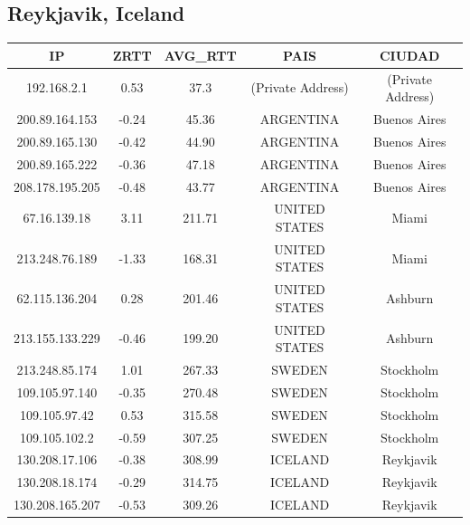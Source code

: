 \FloatBarrier
\subsection{Reykjavik, Iceland}

\begin{tabular}{|c@{\hspace{5ex}}c@{\hspace{5ex}}c@{\hspace{5ex}}c@{\hspace{5ex}}c|}
\hline
\rule{0pt}{1.2em}IP & ZRTT & AVG\_RTT & PAIS & CIUDAD\\[0.2em]
\hline

\rule{0pt}{1.2em} 192.168.2.1  &  0.53 & 37.3 & (Private Address) & (Private Address) \\[0.2em]
\rule{0pt}{1.2em} 200.89.164.153  &  -0.24 & 45.36 & ARGENTINA & Buenos Aires \\[0.2em]
\rule{0pt}{1.2em} 200.89.165.130  &  -0.42 & 44.90 & ARGENTINA & Buenos Aires \\[0.2em]
\rule{0pt}{1.2em} 200.89.165.222  &  -0.36 & 47.18 & ARGENTINA & Buenos Aires \\[0.2em]
\rule{0pt}{1.2em} 208.178.195.205  &  -0.48 & 43.77 & ARGENTINA & Buenos Aires \\[0.2em]
\rule{0pt}{1.2em} 67.16.139.18  &  3.11 & 211.71 & UNITED STATES & Miami \\[0.2em]
\rule{0pt}{1.2em} 213.248.76.189  &  -1.33 & 168.31 & UNITED STATES & Miami \\[0.2em]
\rule{0pt}{1.2em} 62.115.136.204  &  0.28 & 201.46 & UNITED STATES & Ashburn \\[0.2em]
\rule{0pt}{1.2em} 213.155.133.229  &  -0.46 & 199.20 & UNITED STATES & Ashburn \\[0.2em]
\rule{0pt}{1.2em} 213.248.85.174  &  1.01 & 267.33 & SWEDEN & Stockholm \\[0.2em]
\rule{0pt}{1.2em} 109.105.97.140  &  -0.35 & 270.48 & SWEDEN & Stockholm \\[0.2em]
\rule{0pt}{1.2em} 109.105.97.42  &  0.53 & 315.58 & SWEDEN & Stockholm \\[0.2em]
\rule{0pt}{1.2em} 109.105.102.2  &  -0.59 & 307.25 & SWEDEN & Stockholm \\[0.2em]
\rule{0pt}{1.2em} 130.208.17.106  &  -0.38 & 308.99 & ICELAND & Reykjavik \\[0.2em]
\rule{0pt}{1.2em} 130.208.18.174  &  -0.29 & 314.75 & ICELAND & Reykjavik \\[0.2em]
\rule{0pt}{1.2em} 130.208.165.207  &  -0.53 & 309.26 & ICELAND & Reykjavik \\[0.2em]
\hline
\end{tabular}

